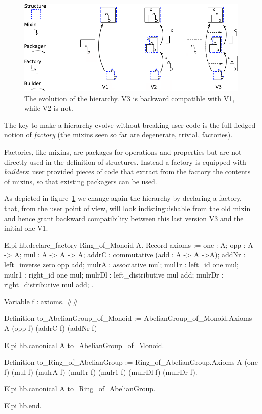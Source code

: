 \documentclass[a4paper,UKenglish,cleveref, autoref]{lipics-v2019}
\newcommand{\mixin}{mixin}
\newcommand{\mixins}{mixins}
\newcommand{\factory}{factory}
\newcommand{\factories}{factories}
\newcommand{\Factories}{Factories}
\newcommand{\packager}{packager}
\newcommand{\builder}{builder}
\theoremstyle{implem}
\theoremstyle{implem}
\theoremstyle{axiom}
\theoremstyle{abscommand}
\theoremstyle{command}
\begin{document}
\begin{figure}[!h]
  \begin{center}
    \includegraphics[width=\textwidth]{puzzle.pdf}
  \end{center}
  \caption{\label{fig:puzzle}The evolution of the hierarchy. V3 is backward compatible with V1, while V2 is not.}
\end{figure}

The key to make a hierarchy evolve without breaking user code is the full
fledged notion of \emph{\factory{}} (the \mixins{} seen so far are degenerate,
trivial, \factories{}).

\Factories{}, like \mixins{}, are packages for operations and properties but are
not directly used in the definition of structures. Instead a \factory{} is
equipped with \emph{\builder{}s}: user provided pieces of code that extract
from the \factory{} the contents of \mixins{}, so that existing
\packager{}s can be used.

As depicted in figure~\ref{fig:puzzle} we change again the hierarchy
by declaring a  \factory{}, that, from the user point of view,
will look indistinguishable from the old  \mixin{}
and hence grant backward compatibility between this last version V3 and the
initial one V1.

\begin{coqcode}
Elpi hb.declare_factory Ring_of_Monoid A.
  Record axioms := {
    one : A;
    opp : A -> A;
    mul : A -> A -> A;
    addrC : commutative (add : A -> A ->A);
    addNr : left_inverse zero opp add;
    mulrA : associative mul;
    mul1r : left_id one mul;
    mulr1 : right_id one mul;
    mulrDl : left_distributive mul add;
    mulrDr : right_distributive mul add;
  }.

  Variable f : axioms.                                                          #\label{demo3:variable:f}#

  Definition to_AbelianGroup_of_Monoid :=
    AbelianGroup_of_Monoid.Axioms A (opp f) (addrC f) (addNr f)

  Elpi hb.canonical A to_AbelianGroup_of_Monoid.

  Definition to_Ring_of_AbelianGroup :=
    Ring_of_AbelianGroup.Axioms A (one f) (mul f)
      (mulrA f) (mul1r f) (mulr1 f) (mulrDl f) (mulrDr f).

  Elpi hb.canonical A to_Ring_of_AbelianGroup.

Elpi hb.end.
\end{coqcode}
\end{document}
